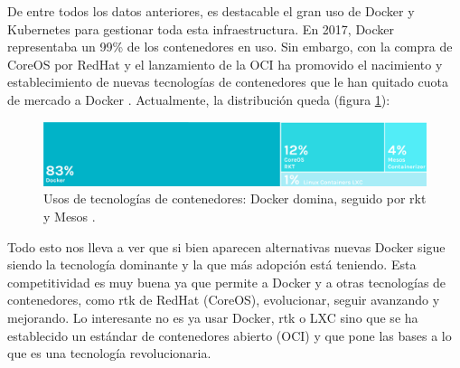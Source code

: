 De entre todos los datos anteriores, es destacable el gran uso de Docker y Kubernetes
para gestionar toda esta infraestructura. En 2017, Docker representaba un 99\% de
los contenedores en uso. Sin embargo, con la compra de CoreOS por RedHat y el
lanzamiento de la OCI ha promovido el nacimiento y establecimiento de nuevas
tecnologías de contenedores que le han quitado cuota de mercado a Docker \cite{Download2018Docker2018}.
Actualmente, la distribución queda (figura \ref{fig:container-runtime}):

\begin{figure}[H]
    \centering
    \includegraphics[width=\linewidth]{pictures/container-runtimes.png}
    \caption{Usos de tecnologías de contenedores: Docker domina, seguido por rkt y Mesos \cite{Download2018Docker2018}.}
    \label{fig:container-runtime}
\end{figure}

Todo esto nos lleva a ver que si bien aparecen alternativas nuevas Docker sigue siendo
la tecnología dominante y la que más adopción está teniendo. Esta competitividad es
muy buena ya que permite a Docker y a otras tecnologías de contenedores, como rtk de 
RedHat (CoreOS), evolucionar, seguir avanzando y mejorando. Lo interesante no es ya
usar Docker, rtk o LXC sino que se ha establecido un estándar de contenedores abierto (OCI)
y que pone las bases a lo que es una tecnología revolucionaria.